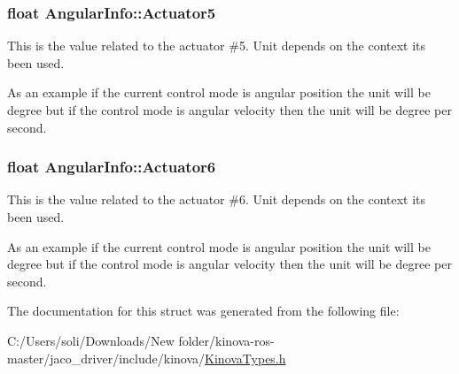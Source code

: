 \subsubsection[{\texorpdfstring{Actuator5}{Actuator5}}]{\setlength{\rightskip}{0pt plus 5cm}float Angular\+Info\+::\+Actuator5}\hypertarget{struct_angular_info_a953c29d2481eb1c42c84e9c992d34dde}{}\label{struct_angular_info_a953c29d2481eb1c42c84e9c992d34dde}


This is the value related to the actuator \#5. Unit depends on the context it\textquotesingle{}s been used. 

As an example if the current control mode is angular position the unit will be degree but if the control mode is angular velocity then the unit will be degree per second. 
\subsubsection[{\texorpdfstring{Actuator6}{Actuator6}}]{\setlength{\rightskip}{0pt plus 5cm}float Angular\+Info\+::\+Actuator6}\hypertarget{struct_angular_info_ab54771129d8a9e451c27942dd349340d}{}\label{struct_angular_info_ab54771129d8a9e451c27942dd349340d}


This is the value related to the actuator \#6. Unit depends on the context it\textquotesingle{}s been used. 

As an example if the current control mode is angular position the unit will be degree but if the control mode is angular velocity then the unit will be degree per second. 

The documentation for this struct was generated from the following file\+:\begin{DoxyCompactItemize}
\item 
C\+:/\+Users/soli/\+Downloads/\+New folder/kinova-\/ros-\/master/jaco\+\_\+driver/include/kinova/\hyperlink{_kinova_types_8h}{Kinova\+Types.\+h}\end{DoxyCompactItemize}
